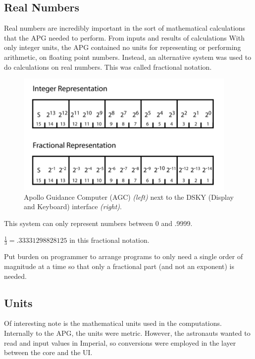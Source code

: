 \documentclass[a4paper,11pt]{article}
\begin{document}
\subsection{Real Numbers}
Real numbers are incredibly important in the sort of mathematical calculations that the APG needed to perform.  From inputs and results of calculations
With only integer units, the APG contained no units for representing or performing arithmetic, on floating point numbers.   Instead, an alternative system was used to do calculations on real numbers.  This was called fractional notation.  

\begin{figure}[h!]
\caption{Apollo Guidance Computer (AGC) {\it (left)} next to the DSKY (Display and Keyboard) interface {\it (right)}.} 
\centering
\includegraphics[width=.8\textwidth]{apg_numbers.png} 
\end{figure}
\vspace{0.02cm}

This system can only represent numbers between 0 and .9999.

$\frac{1}{3} = .33331298828125$ in this fractional notation.  



Put burden on programmer to arrange programs to only need a single order of magnitude at a time so that only a fractional part (and not an exponent) is needed.

\subsection{Units}
Of interesting note is the mathematical units used in the computations.  Internally to the APG, the units were metric.  However, the astronauts wanted to read and input values in Imperial, so conversions were employed in the layer between the core and the UI.

\end{document}
